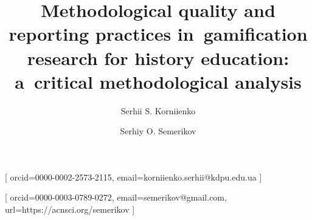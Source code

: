 \documentclass[etq]{acnsart}
\begin{document}
	
	
	\title{Methodological quality and reporting practices in~gamification research for history education: a~critical methodological analysis}
	
	
	\author[1]{Serhii S. Korniienko}[%
	orcid={0000-0002-2573-2115},
	email={korniienko.serhii@kdpu.edu.ua}
	]
	
	\author[1,2,3,4]{Serhiy O. Semerikov}[
	orcid=0000-0003-0789-0272,
	email={semerikov@gmail.com},
	url={https://acnsci.org/semerikov}
	]
	
	
	
	\address[1]{Kryvyi Rih State Pedagogical University, 54 Universytetskyi Ave., Kryvyi Rih, 50086, Ukraine}
	\address[2]{Academy of Cognitive and Natural Sciences, 54 Universytetskyi Ave., Kryvyi Rih, 50086, Ukraine}
	\address[3]{Institute for Digitalisation of Education of the NAES of Ukraine, 9 M. Berlynskoho Str., Kyiv, 04060, Ukraine}
	\address[4]{Zhytomyr Polytechnic State University, 103 Chudnivsyka Str., Zhytomyr, 10005, Ukraine}
	
	
	
\end{document}
